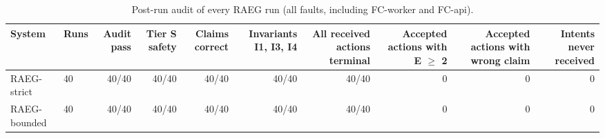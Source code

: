 \begin{table}[t]
\centering
\scriptsize
\caption{Post-run audit of every RAEG run (all faults, including FC-worker and FC-api).}
\label{tab:m7-audit}
\begin{tabular}{llrrrrrrrr}
\toprule
System & Runs & Audit pass & Tier S safety & Claims correct & Invariants I1, I3, I4 & All received actions terminal & Accepted actions with E $\geq$ 2 & Accepted actions with wrong claim & Intents never received \\
\midrule
RAEG-strict & 40 & 40/40 & 40/40 & 40/40 & 40/40 & 40/40 & 0 & 0 & 0 \\
RAEG-bounded & 40 & 40/40 & 40/40 & 40/40 & 40/40 & 40/40 & 0 & 0 & 0 \\
\bottomrule
\end{tabular}
\end{table}

